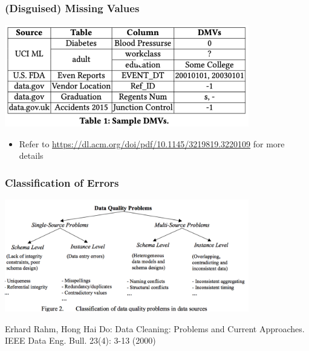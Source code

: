 \documentclass[aspectratio=169]{../latex_main/tntbeamer}  %
\begin{document}
\begin{frame}
\frametitle{(Disguised) Missing Values}

\centering
\includegraphics[width=0.8\textwidth]{figure/bild14_missing_values}

\begin{itemize}
    \item Refer to \url{https://dl.acm.org/doi/pdf/10.1145/3219819.3220109} for more details
\end{itemize}

\end{frame}

\begin{frame}
\frametitle{Classification of Errors}

\centering
\includegraphics[width=0.8\textwidth]{figure/bild15_quality_problems.png}

\bigskip
\tiny
Erhard Rahm, Hong Hai Do: Data Cleaning: Problems and Current Approaches. IEEE Data Eng. Bull. 23(4): 3-13 (2000)

\end{frame}
\end{document}

